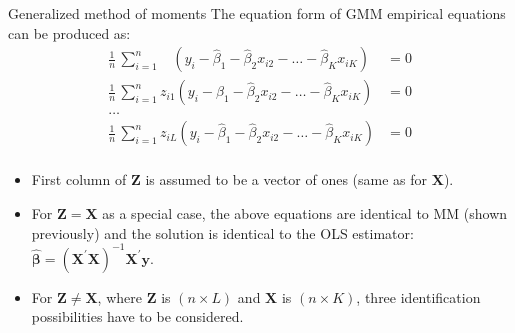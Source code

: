 \documentclass{beamer}
\begin{document}
\begin{frame}{Generalized method of moments}
The equation form of GMM empirical equations can be produced as:
\medskip
\footnotesize
\begin{equation*}
\begin{aligned}
\frac{1}{n}\, \sum_{i=1}^n ~~~~\left( y_i - \hat{\beta}_1 - \hat{\beta}_2 x_{i2} - \dots - \hat{\beta}_K x_{iK} \right) &= 0\\
\frac{1}{n}\, \sum_{i=1}^n  z_{i1} \left( y_i - \hat{\beta}_1 - \hat{\beta}_2 x_{i2} - \dots - \hat{\beta}_K x_{iK} \right) &= 0\\
\dots &\\
\frac{1}{n}\, \sum_{i=1}^n z_{iL} \left( y_i - \hat{\beta}_1 - \hat{\beta}_2 x_{i2} - \dots - \hat{\beta}_K x_{iK} \right) &= 0\\
\end{aligned}
\end{equation*}
\medskip
\begin{itemize}
    \item First column of $\bm{Z}$ is assumed to be a vector of ones (same as for $\bm{X}$).
    \smallskip
    \item For $\bm{Z}=\bm{X}$ as a special case, the above equations are identical to MM (shown previously) and the solution is identical to the OLS estimator: $\hat{\bm{\beta}}=(\bm{X}^{\prime}\bm{X})^{-1} \bm{X}^{\prime}\bm{y}$.
    \smallskip
    \item For $\bm{Z} \neq \bm{X}$, where $\bm{Z}$ is $(n\! \times \!L)$ and $\bm{X}$ is $(n \! \times \!K)$, three identification possibilities have to be considered. 
\end{itemize}
\end{frame}
\end{document}

